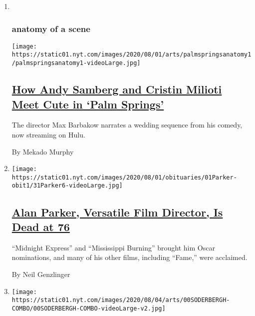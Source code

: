 \begin{enumerate}
\def\labelenumi{\arabic{enumi}.}
\item ~
  \hypertarget{anatomy-of-a-scene}{%
  \subsubsection{anatomy of a scene}\label{anatomy-of-a-scene}}

  \texttt{[image: https://static01.nyt.com/images/2020/08/01/arts/palmspringsanatomy1/palmspringsanatomy1-videoLarge.jpg]}

  \hypertarget{how-andy-samberg-and-cristin-milioti-meet-cute-in-palm-springs}{%
  \subsection{\texorpdfstring{\href{/2020/07/31/movies/palm-springs-clip-hulu.html}{How
  Andy Samberg and Cristin Milioti Meet Cute in `Palm
  Springs'}}{How Andy Samberg and Cristin Milioti Meet Cute in `Palm Springs'}}\label{how-andy-samberg-and-cristin-milioti-meet-cute-in-palm-springs}}

  The director Max Barbakow narrates a wedding sequence from his comedy,
  now streaming on Hulu.

  By Mekado Murphy
\item
  \texttt{[image: https://static01.nyt.com/images/2020/08/01/obituaries/01Parker-obit1/31Parker6-videoLarge.jpg]}

  \hypertarget{alan-parker-versatile-film-director-is-dead-at-76}{%
  \subsection{\texorpdfstring{\href{/2020/07/31/movies/alan-parker-versatile-film-director-is-dead-at-76.html}{Alan
  Parker, Versatile Film Director, Is Dead at
  76}}{Alan Parker, Versatile Film Director, Is Dead at 76}}\label{alan-parker-versatile-film-director-is-dead-at-76}}

  ``Midnight Express'' and ``Mississippi Burning'' brought him Oscar
  nominations, and many of his other films, including ``Fame,'' were
  acclaimed.

  By Neil Genzlinger
\item
  \texttt{[image: https://static01.nyt.com/images/2020/08/04/arts/00SODERBERGH-COMBO/00SODERBERGH-COMBO-videoLarge-v2.jpg]}

  \hypertarget{steven-soderbergh-and-amy-seimetz-made-the-pandemic-movies-of-the-moment}{%
}
\end{enumerate}

